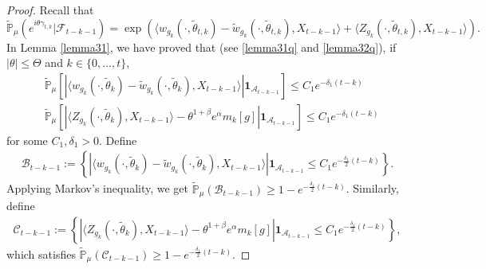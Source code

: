 \documentclass[12pt, a4paper]{amsart}
\theoremstyle{definition}
\numberwithin{equation}{section}
\begin{document}
\begin{proof}
    Recall that 
    $$\mathbb{\tilde{P}}_{\mu}\left(e^{i\theta \gamma_{t,k}}|\mathcal{F}_{t-k-1}\right)=\exp(\langle w_{g_k}(\cdot,\tilde{\theta}_{t,k})-\tilde{w}_{g_k}(\cdot, \tilde{\theta}_{t,k}),X_{t-k-1}\rangle+\langle Z_{g_k}(\cdot,\tilde{\theta}_{t,k}),X_{t-k-1}\rangle).$$
    In Lemma \ref{lemma31}, we have proved that (see \eqref{lemma31q} and \eqref{lemma32q}), if $|\theta|\leq\Theta$ and $k\in\{0,...,t\}$,
    \begin{align*}
        &\mathbb{\tilde{P}}_{\mu}\left[\left|\langle w_{g_k}(\cdot,\tilde{\theta}_k)-\tilde{w}_{g_k}(\cdot,\tilde{\theta}_k), X_{t-k-1}\rangle\right|\mathbf{1}_{\mathcal{A}_{t-k-1}}\right]\leq C_1 e^{-\delta_1 (t-k)}\\
        &\mathbb{\tilde{P}}_{\mu}\left[\left|\langle Z_{g_k}(\cdot,\tilde{\theta}_k),X_{t-k-1}\rangle-\theta^{1+\beta}e^{\alpha}m_k[g]\right|\mathbf{1}_{\mathcal{A}_{t-k-1}}\right]\leq C_1 e^{-\delta_1(t-k)}
    \end{align*}
for some $C_1,\delta_1>0$. Define 
\begin{align*}
    \mathcal{B}_{t-k-1}:=\left\{\left|\langle w_{g_k}(\cdot,\tilde{\theta}_k)-\tilde{w}_{g_k}(\cdot,\tilde{\theta}_k), X_{t-k-1}\rangle\right|\mathbf{1}_{\mathcal{A}_{t-k-1}}\leq C_1 e^{-\frac{\delta_1}{2}(t-k)}\right\}.
\end{align*}
Applying Markov's inequality, we get $\mathbb{\tilde{P}}_{\mu}(\mathcal{B}_{t-k-1})\geq 1- e^{-\frac{\delta_1}{2}(t-k)}$. Similarly, define
\begin{align*}
    \mathcal{C}_{t-k-1}:=\left\{\left|\langle Z_{g_k}(\cdot,\tilde{\theta}_k),X_{t-k-1}\rangle-\theta^{1+\beta}e^{\alpha}m_k[g]\right|\mathbf{1}_{\mathcal{A}_{t-k-1}}\leq C_1 e^{-\frac{\delta_1}{2}(t-k)}\right\},
\end{align*}
 which satisfies  $\mathbb{\tilde{P}}_{\mu}(\mathcal{C}_{t-k-1})\geq 1- e^{-\frac{\delta_1}{2}(t-k)}$.


\end{proof}
\end{document}
